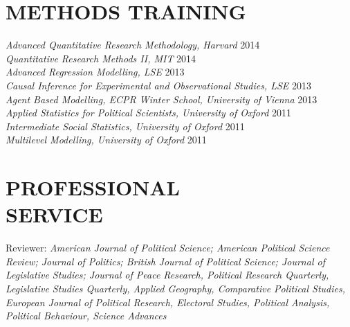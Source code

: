 \documentclass[centered]{res}
\begin{document}
\begin{resume}


\section{METHODS TRAINING}	
{\sl Advanced Quantitative Research Methodology, Harvard} \hfill 2014 \\
{\sl Quantitative Research Methods II, MIT} \hfill 2014 \\
{\sl Advanced Regression Modelling, LSE} \hfill 2013 \\
{\sl Causal Inference for Experimental and Observational Studies, LSE} \hfill 2013 \\
{\sl Agent Based Modelling, ECPR Winter School, University of Vienna} \hfill 2013\\
{\sl Applied Statistics for Political Scientists, University of Oxford} \hfill 2011 \\			
 {\sl Intermediate Social Statistics, University of Oxford} \hfill 2011 \\
{\sl Multilevel Modelling, University of Oxford} \hfill 2011 



\section{PROFESSIONAL \\ SERVICE}  Reviewer: \emph{American Journal of Political Science; American Political Science Review; Journal of Politics; British Journal of Political Science; Journal of Legislative Studies; Journal of Peace Research, Political Research Quarterly, Legislative Studies Quarterly, Applied Geography, Comparative Political Studies, European Journal of Political Research, Electoral Studies, Political Analysis, Political Behaviour, Science Advances} 
           

\end{resume}
\end{document}
